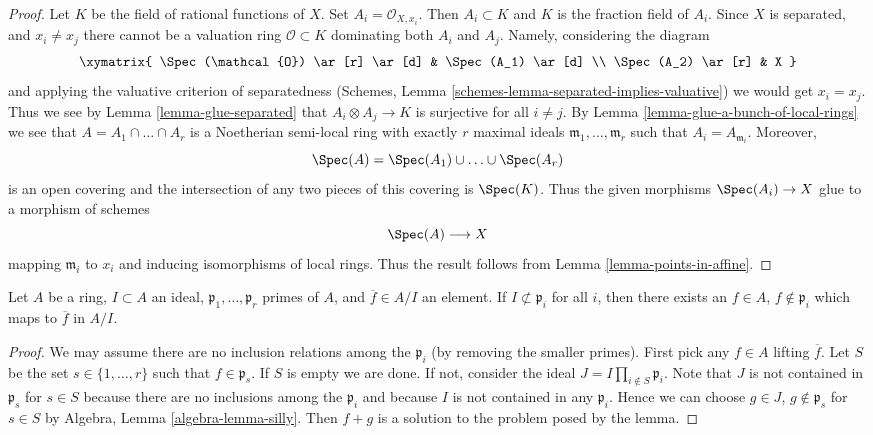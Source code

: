 \begin{proof}
Let $K$ be the field of rational functions of $X$.
Set $A_i = \mathcal{O}_{X, x_i}$. Then $A_i \subset K$ and $K$
is the fraction field of $A_i$. Since $X$ is separated, and
$x_i \not = x_j$ there cannot be a valuation ring $\mathcal{O} \subset K$
dominating both $A_i$ and $A_j$. Namely, considering the
diagram
$$
\xymatrix{
\Spec(\mathcal{O}) \ar[r] \ar[d] & \Spec(A_1) \ar[d] \\
\Spec(A_2) \ar[r] & X
}
$$
and applying the valuative criterion of separatedness
(Schemes, Lemma \ref{schemes-lemma-separated-implies-valuative})
we would get $x_i = x_j$. Thus we see by
Lemma \ref{lemma-glue-separated}
that $A_i \otimes A_j \to K$ is surjective for all $i \not = j$.
By Lemma \ref{lemma-glue-a-bunch-of-local-rings}
we see that $A = A_1 \cap \ldots \cap A_r$ is a Noetherian
semi-local ring with exactly $r$ maximal ideals
$\mathfrak m_1, \ldots, \mathfrak m_r$ such that $A_i = A_{\mathfrak m_i}$.
Moreover,
$$
\Spec(A) = \Spec(A_1) \cup \ldots \cup \Spec(A_r)
$$
is an open covering and the intersection of any two pieces of this
covering is $\Spec(K)$. Thus the given morphisms $\Spec(A_i) \to X$
glue to a morphism of schemes
$$
\Spec(A) \longrightarrow X
$$
mapping $\mathfrak m_i$ to $x_i$ and inducing isomorphisms of local rings.
Thus the result follows from Lemma \ref{lemma-points-in-affine}.
\end{proof}

\begin{lemma}
\label{lemma-extra-silly}
Let $A$ be a ring, $I \subset A$ an ideal,
$\mathfrak p_1, \ldots, \mathfrak p_r$ primes of $A$, and
$\overline{f} \in A/I$ an element. If $I \not \subset \mathfrak p_i$
for all $i$, then there exists an $f \in A$, $f \not \in \mathfrak p_i$
which maps to $\overline{f}$ in $A/I$.
\end{lemma}

\begin{proof}
We may assume there are no inclusion relations among the $\mathfrak p_i$
(by removing the smaller primes). First pick any $f \in A$ lifting
$\overline{f}$. Let $S$ be the set $s \in \{1, \ldots, r\}$ such
that $f \in \mathfrak p_s$. If $S$ is empty we are done. If not,
consider the ideal $J = I \prod_{i \not \in S} \mathfrak p_i$.
Note that $J$ is not contained in $\mathfrak p_s$ for $s \in S$
because there are no inclusions among the $\mathfrak p_i$ and because
$I$ is not contained in any $\mathfrak p_i$.
Hence we can choose $g \in J$, $g \not \in \mathfrak p_s$ for
$s \in S$ by Algebra, Lemma \ref{algebra-lemma-silly}.
Then $f + g$ is a solution to the problem posed by the lemma.
\end{proof}

